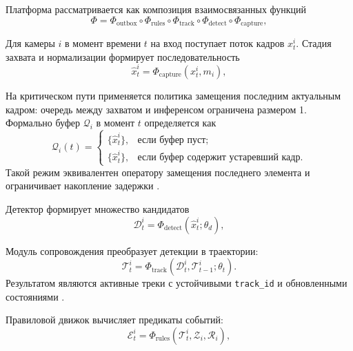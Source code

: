Платформа рассматривается как композиция взаимосвязанных функций
\begin{equation}
\Phi = \Phi_{\text{outbox}} \circ \Phi_{\text{rules}} \circ \Phi_{\text{track}} \circ \Phi_{\text{detect}} \circ \Phi_{\text{capture}},
\end{equation}
\where
{}
 \cite{fastapi_docs,pyav_docs,ultralytics_docs}

Для камеры \(i\) в момент времени \(t\) на вход поступает поток кадров \(x^i_t\). Стадия захвата и нормализации формирует последовательность
\begin{equation}
\hat{x}^i_t = \Phi_{\text{capture}}(x^i_t, m_i),
\end{equation}
\where
{}

На критическом пути применяется политика замещения последним актуальным кадром: очередь между захватом и инференсом ограничена размером 1. Формально буфер \(\mathcal{Q}_i\) в момент \(t\) определяется как
\begin{equation}
\mathcal{Q}_i(t) =
\begin{cases}
\{\hat{x}^i_t\}, & \text{если буфер пуст;}\\
\{\hat{x}^i_t\}, & \text{если буфер содержит устаревший кадр.}
\end{cases}
\end{equation}
Такой режим эквивалентен оператору замещения последнего элемента и ограничивает накопление задержки \cite{ffmpeg_docs}.

Детектор формирует множество кандидатов
\begin{equation}
\mathcal{D}^i_t = \Phi_{\text{detect}}(\hat{x}^i_t;\theta_d),
\end{equation}
\where
{} \cite{redmon2016yolo,redmon2018yolov3,ultralytics_docs}

Модуль сопровождения преобразует детекции в траектории:
\begin{equation}
\mathcal{T}^i_t = \Phi_{\text{track}}(\mathcal{D}^i_t, \mathcal{T}^i_{t-1}; \theta_t).
\end{equation}
Результатом являются активные треки с устойчивыми \texttt{track\_id} и обновленными состояниями \cite{bewley2016sort,wojke2017deepsort}.

Правиловой движок вычисляет предикаты событий:
\begin{equation}
\mathcal{E}^i_t = \Phi_{\text{rules}}(\mathcal{T}^i_t, \mathcal{Z}_i, \mathcal{R}_i),
\end{equation}
\where
{}

